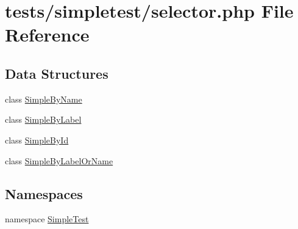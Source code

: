 \hypertarget{selector_8php}{\section{tests/simpletest/selector.php File Reference}
\label{selector_8php}
}
\subsection*{Data Structures}
\begin{DoxyCompactItemize}
\item 
class \hyperlink{class_simple_by_name}{Simple\-By\-Name}
\item 
class \hyperlink{class_simple_by_label}{Simple\-By\-Label}
\item 
class \hyperlink{class_simple_by_id}{Simple\-By\-Id}
\item 
class \hyperlink{class_simple_by_label_or_name}{Simple\-By\-Label\-Or\-Name}
\end{DoxyCompactItemize}
\subsection*{Namespaces}
\begin{DoxyCompactItemize}
\item 
namespace \hyperlink{namespace_simple_test}{Simple\-Test}
\end{DoxyCompactItemize}
